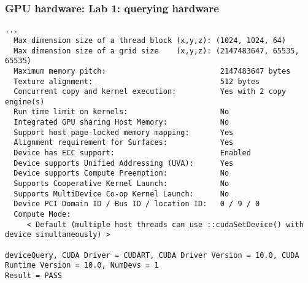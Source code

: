 \begin{frame}[fragile]
  \frametitle{GPU hardware: Lab 1: querying hardware}
{\tiny
{\color{mycolorcli}
\begin{verbatim}
...
  Max dimension size of a thread block (x,y,z): (1024, 1024, 64)
  Max dimension size of a grid size    (x,y,z): (2147483647, 65535, 65535)
  Maximum memory pitch:                          2147483647 bytes
  Texture alignment:                             512 bytes
  Concurrent copy and kernel execution:          Yes with 2 copy engine(s)
  Run time limit on kernels:                     No
  Integrated GPU sharing Host Memory:            No
  Support host page-locked memory mapping:       Yes
  Alignment requirement for Surfaces:            Yes
  Device has ECC support:                        Enabled
  Device supports Unified Addressing (UVA):      Yes
  Device supports Compute Preemption:            No
  Supports Cooperative Kernel Launch:            No
  Supports MultiDevice Co-op Kernel Launch:      No
  Device PCI Domain ID / Bus ID / location ID:   0 / 9 / 0
  Compute Mode:
     < Default (multiple host threads can use ::cudaSetDevice() with device simultaneously) >

deviceQuery, CUDA Driver = CUDART, CUDA Driver Version = 10.0, CUDA Runtime Version = 10.0, NumDevs = 1
Result = PASS

\end{verbatim}
}
}

\end{frame}
